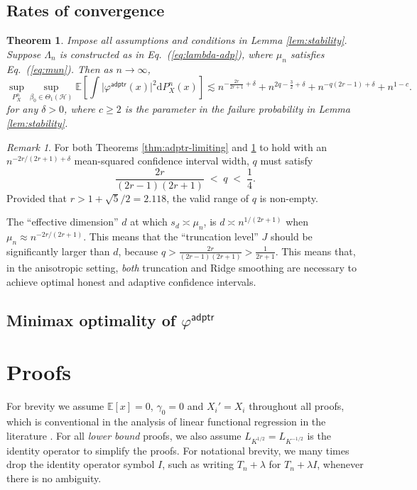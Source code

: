 \documentclass[11pt,a4paper]{article}
\theoremstyle{definition}
\theoremstyle{plain}
\newtheorem{theorem}{Theorem}[section]
\theoremstyle{remark}
\newtheorem{remark}{Remark}[section]
\newcommand{\ud}{\mathrm d}
\newcommand{\mH}{\mathcal H}
\newcommand{\adptr}{\mathsf{adptr}}
\begin{document}
\subsection{Rates of convergence}


\begin{theorem}
Impose all assumptions and conditions in Lemma \ref{lem:stability}. Suppose $\Lambda_n$ is constructed as in Eq.~(\ref{eq:lambda-adp}),
where $\mu_n$ satisfies Eq.~(\ref{eq:mun}). Then as $n\to\infty$, 
$$
\sup_{P_X^n}\sup_{\beta_0\in\Theta_1(\mH)}\mathbb E\left[\int \big|\varphi^\adptr(x)\big|^2\ud P_X^n(x) \right] \lesssim n^{-\frac{2r}{2r+1}+\delta} + n^{2q-\frac{3}{2}+\delta} + n^{-q(2r-1)+\delta} + n^{1-c}.
$$
for any $\delta>0$, where $c\geq 2$ is the parameter in the failure probability in Lemma \ref{lem:stability}.
\label{thm:adptr-rates}
\end{theorem}

\begin{remark}
For both Theorems \ref{thm:adptr-limiting} and \ref{thm:adptr-rates} to hold with an $n^{-2r/(2r+1)+\delta}$ mean-squared confidence interval width, $q$ must satisfy
$$
\frac{2r}{(2r-1)(2r+1)}\;<\; q\;<\; \frac{1}{4}.
$$
Provided that $r>1+\sqrt{5}/2=2.118$, the valid range of $q$ is non-empty.
\end{remark}


The ``effective dimension'' $d$ at which $s_d\asymp \mu_n$, is $d\asymp n^{1/(2r+1)}$ when $\mu_n\approx n^{-2r/(2r+1)}$.
This means that the ``truncation level'' $J$ should be significantly larger than $d$, because $q>\frac{2r}{(2r-1)(2r+1)} > \frac{1}{2r+1}$.
This means that, in the anisotropic setting, \emph{both} truncation and Ridge smoothing are necessary to achieve optimal honest and adaptive confidence intervals.

\subsection{Minimax optimality of $\varphi^{\adptr}$}


\section{Proofs}

For brevity we assume $\mathbb E[x]=0$, $\gamma_0=0$ and $X_i'=X_i$ throughout all proofs, which is conventional in the analysis of linear functional regression in the literature \citep{cai2012minimax,yuan2010reproducing}.
For all \emph{lower bound} proofs, we also assume $L_{K^{1/2}}=L_{K^{-1/2}}$ is the identity operator to simplify the proofs.
For notational brevity, we many times drop the identity operator symbol $I$, such as writing $T_n+\lambda$ for $T_n+\lambda I$, whenever there is no ambiguity.
\end{document}
